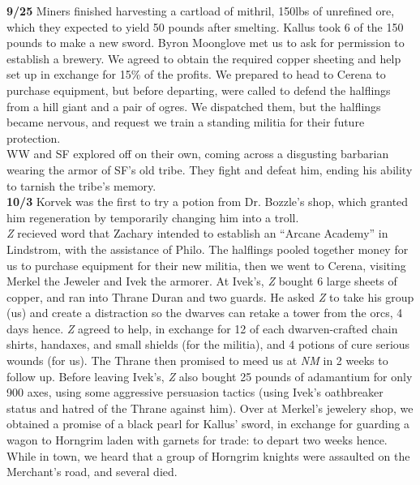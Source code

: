 \documentclass[letterpaper]{article}
\begin{document}
\noindent \textbf{9/25} Miners finished harvesting a cartload of mithril, 150lbs of unrefined ore, which they expected to yield 50 pounds after smelting. Kallus took 6 of the 150 pounds to make a new sword.  Byron Moonglove met us to ask for permission to establish a brewery.  We agreed to obtain the required copper sheeting and help set up in exchange for 15\% of the profits. We prepared to head to Cerena to purchase equipment, but before departing, were called to defend the halflings from a hill giant and a pair of ogres.  We dispatched them, but the halflings became nervous, and request we train a standing militia for their future protection. \\

\noindent WW and SF explored off on their own, coming across a disgusting barbarian wearing the armor of SF's old tribe.  They fight and defeat him, ending his ability to tarnish the tribe's memory. \\

\noindent \textbf{10/3} Korvek was the first to try a potion from Dr. Bozzle's shop, which granted him regeneration by temporarily changing him into a troll. \\

\noindent \emph{Z} recieved word that Zachary intended to establish an ``Arcane Academy'' in Lindstrom, with the assistance of Philo.  The halflings pooled together money for us to purchase equipment for their new militia, then we went to Cerena, visiting Merkel the Jeweler and Ivek the armorer.  At Ivek's, \emph{Z} bought 6 large sheets of copper, and ran into Thrane Duran and two guards.  He asked \emph{Z} to take his group (us) and create a distraction so the dwarves can retake a tower from the orcs, 4 days hence. \emph{Z} agreed to help, in exchange for 12 of each dwarven-crafted chain shirts, handaxes, and small shields (for the militia), and 4 potions of cure serious wounds (for us).  The Thrane then promised to meed us at \emph{NM} in 2 weeks to follow up.  Before leaving Ivek's, \emph{Z} also bought 25 pounds of adamantium for only 900 axes, using some aggressive persuasion tactics (using Ivek's oathbreaker status and hatred of the Thrane against him).  Over at Merkel's jewelery shop, we obtained a promise of a black pearl for Kallus' sword, in exchange for guarding a wagon to Horngrim laden with garnets for trade: to depart two weeks hence. While in town, we heard that a group of Horngrim knights were assaulted on the Merchant's road, and several died. \\
\end{document}
